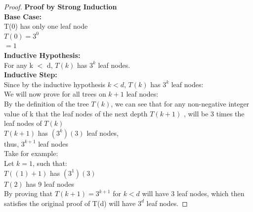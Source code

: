 \documentclass[11pt]{article}
\theoremstyle{definition}
\theoremstyle{definition}
\theoremstyle{definition}
\begin{document}
\begin{proof} \textbf {Proof by Strong Induction} \\
\textbf{Base Case:}\\
\indent T(0) has only one leaf node\\
\indent\indent $T(0) = 3^0$\\
\indent\indent $= 1$ \\ 



\textbf{Inductive Hypothesis:} \\
\indent For any k $<$ d,  $T(k)$ has $3^k$ leaf nodes.\\

\textbf{Inductive Step:}\\
\indent Since by the inductive hypothesis $k < d$, $T(k)$ has $3^k$ leaf nodes: \\

\indent We will now prove for all trees on $k+1$ leaf nodes: \\
\indent By the definition of the tree $T(k)$, we can see that for any non-negative integer value of k that the leaf nodes of the next depth $T(k+1)$ , will be 3 times the leaf nodes of $T(k)$ \\
\indent $T(k+1)$ has $(3^k)(3)$ leaf nodes, \\
\indent\indent thus, $3^{k+1}$ leaf nodes \\

\indent Take for example: \\
\indent Let $k = 1$, such that: \\
\indent$T((1) + 1)$ has $(3^1)(3)$ \\
\indent$T(2)$ has 9 leaf nodes \\

\indent By proving that $T(k+1) = 3^{k+1}$ for $k<d$ will have 3 leaf nodes, which then satisfies the original proof of T(d) will have $ 3^d$ leaf nodes.
\end{proof}
\end{document}
